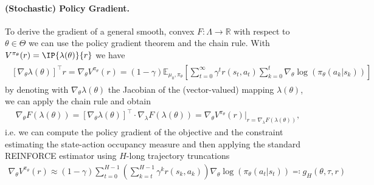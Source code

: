 \documentclass{article}
\theoremstyle{plain}
\theoremstyle{definition}
\theoremstyle{remark}
\def\RR{{\mathbb{R}}}
\newcommand{\Expu}[2]{{\mathbb{E}}_{#1}\!\left[#2\right]}
\newcommand{\defineRev}{\eqqcolon}
\def\ss{{s}}
\def\aa{{a}}
\def\ss{{s}}
\def\rew{{r}}
\begin{document}
\paragraph{(Stochastic) Policy Gradient.}
To derive the gradient of a general smooth, convex $F:\Lambda \to \RR$ with
respect to $\theta \in \Theta$ we can use the policy gradient theorem
\cite{suttonPolicyGradientMethods1999} and the chain rule. With
$V^{\pi_\theta}(\rew) = \IP{\lambda(\theta)}{\rew}$ we have
\begin{align}
 \begin{aligned}
  [\nabla_\theta \lambda(\theta)]^\top \rew
  = \nabla_\theta V^{\pi_\theta}(\rew)
  = (1-\gamma)\Expu{\mu_0, \pi_\theta}{\sum_{t=0}^{\infty}
   \gamma^t \rew(\ss_t, \aa_t) \sum_{k=0}^{t}
   \nabla_\theta \log(\pi_{\theta}(\aa_k \vert \ss_k))}
 \end{aligned}
 \tag{PG-Thm}
 \label{eq:PolicyGradientTheorem}
\end{align}
by denoting with $\nabla_\theta \lambda(\theta)$
the Jacobian of the (vector-valued) mapping
$\lambda(\theta)$, we can apply the chain rule and obtain
\begin{align*}
 \nabla_\theta F(\lambda(\theta))  =
 [\nabla_\theta\lambda(\theta)]^\top \cdot
 \nabla_\lambda F(\lambda(\theta))
 = \nabla_\theta V^{\pi_\theta}(\rew)\bigg\vert_{
  \rew = \nabla_\lambda F(\lambda(\theta))},
\end{align*}
i.e. we can compute the policy gradient of the objective
and the constraint estimating the state-action occupancy measure
and then applying the standard REINFORCE
\cite{zhangSampleEfficientReinforcement2021} estimator
using $H$-long trajectory truncations
\begin{align*}
 \nabla_\theta V^{\pi_\theta}(\rew)
 \approx (1-\gamma)\sum_{t=0}^{H-1} \left(\sum_{k=t}^{H-1}
 \gamma^k \rew(\ss_k, \aa_k)\right) \nabla_\theta
 \log(\pi_\theta(\aa_t\vert \ss_t))
 \defineRev g_H(\theta, \tau, \rew)
\end{align*}
\end{document}
